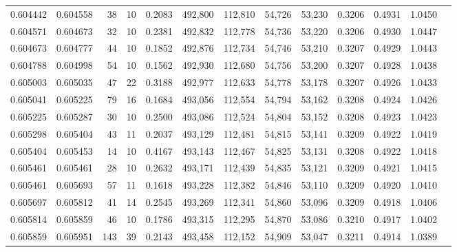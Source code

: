 \begin{tabular}{rrrrrrrrrrrrr}
0.604442 & 0.604558 &    38 &  10 &                                     0.2083 & 492,800 & 112,810 &  54,726 &  53,230 & 0.3206 & 0.4931 & 1.0450 \\
0.604571 & 0.604673 &    32 &  10 &                                     0.2381 & 492,832 & 112,778 &  54,736 &  53,220 & 0.3206 & 0.4930 & 1.0447 \\
0.604673 & 0.604777 &    44 &  10 &                                     0.1852 & 492,876 & 112,734 &  54,746 &  53,210 & 0.3207 & 0.4929 & 1.0443 \\
0.604788 & 0.604998 &    54 &  10 &                                     0.1562 & 492,930 & 112,680 &  54,756 &  53,200 & 0.3207 & 0.4928 & 1.0438 \\
0.605003 & 0.605035 &    47 &  22 &                                     0.3188 & 492,977 & 112,633 &  54,778 &  53,178 & 0.3207 & 0.4926 & 1.0433 \\
0.605041 & 0.605225 &    79 &  16 &                                     0.1684 & 493,056 & 112,554 &  54,794 &  53,162 & 0.3208 & 0.4924 & 1.0426 \\
0.605225 & 0.605287 &    30 &  10 &                                     0.2500 & 493,086 & 112,524 &  54,804 &  53,152 & 0.3208 & 0.4923 & 1.0423 \\
0.605298 & 0.605404 &    43 &  11 &                                     0.2037 & 493,129 & 112,481 &  54,815 &  53,141 & 0.3209 & 0.4922 & 1.0419 \\
0.605404 & 0.605453 &    14 &  10 &                                     0.4167 & 493,143 & 112,467 &  54,825 &  53,131 & 0.3208 & 0.4922 & 1.0418 \\
0.605461 & 0.605461 &    28 &  10 &                                     0.2632 & 493,171 & 112,439 &  54,835 &  53,121 & 0.3209 & 0.4921 & 1.0415 \\
0.605461 & 0.605693 &    57 &  11 &                                     0.1618 & 493,228 & 112,382 &  54,846 &  53,110 & 0.3209 & 0.4920 & 1.0410 \\
0.605697 & 0.605812 &    41 &  14 &                                     0.2545 & 493,269 & 112,341 &  54,860 &  53,096 & 0.3209 & 0.4918 & 1.0406 \\
0.605814 & 0.605859 &    46 &  10 &                                     0.1786 & 493,315 & 112,295 &  54,870 &  53,086 & 0.3210 & 0.4917 & 1.0402 \\
0.605859 & 0.605951 &   143 &  39 &                                     0.2143 & 493,458 & 112,152 &  54,909 &  53,047 & 0.3211 & 0.4914 & 1.0389 \\

\end{tabular}
